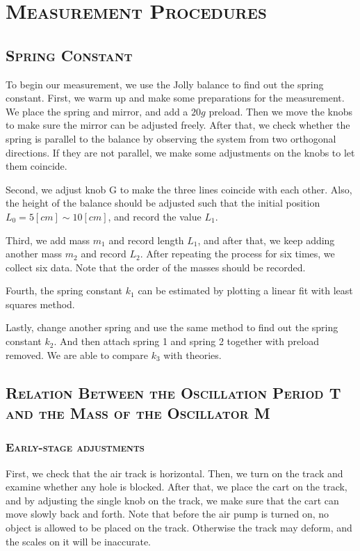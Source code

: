 \documentclass[a4paper,12pt]{article}
\begin{document}
\section{\textsc{Measurement Procedures}}
\subsection{\textsc{Spring Constant}}
To begin our measurement, we use the Jolly balance to find out the spring constant. First, we warm up and make some preparations for the measurement. We place the spring and mirror, and add a $20g$ preload. Then we move the knobs to make sure the mirror can be adjusted freely. After that, we check whether the spring is parallel to the balance by observing the system from two orthogonal directions. If they are not parallel, we make some adjustments on the knobs to let them coincide.
\par Second, we adjust knob G to make the three lines coincide with each other. Also, the height of the balance should be adjusted such that the initial position $L_0 = 5 [cm] \sim 10 [cm]$, and record the value $L_1$.
\par Third, we add mass $m_1$ and record length $L_1$, and after that, we keep adding another mass $m_2$ and record $L_2$. After repeating the process for six times, we collect six data. Note that the order of the masses should be recorded.
\par Fourth, the spring constant $k_1$ can be estimated by plotting a linear fit with least squares method.
\par Lastly, change another spring and use the same method to find out the spring constant $k_2$. And then attach spring 1 and spring 2 together with preload removed. We are able to compare $k_3$ with theories.

\subsection{\textsc{Relation Between the Oscillation Period T and the Mass of the Oscillator M}}
\subsubsection{\textsc{Early-stage adjustments}}
First, we check that the air track is horizontal. Then, we turn on the track and examine whether any hole is blocked. After that, we place the cart on the track, and by adjusting the single knob on the track, we make sure that the cart can move slowly back and forth. Note that before the air pump is turned on, no object is allowed to be placed on the track. Otherwise the track may deform, and the scales on it will be inaccurate.
\end{document}
